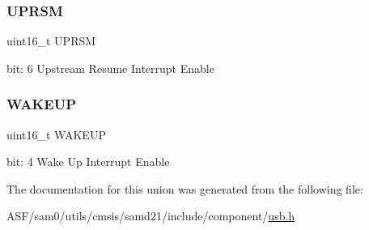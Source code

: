 \subsubsection{\texorpdfstring{UPRSM}{UPRSM}}
{\footnotesize\ttfamily uint16\+\_\+t U\+P\+R\+SM}

bit\+: 6 Upstream Resume Interrupt Enable \mbox{\label{union_u_s_b___d_e_v_i_c_e___i_n_t_e_n_s_e_t___type_a8daebdfb4a00acfdbe16023d636e3887}} 
\subsubsection{\texorpdfstring{WAKEUP}{WAKEUP}}
{\footnotesize\ttfamily uint16\+\_\+t W\+A\+K\+E\+UP}

bit\+: 4 Wake Up Interrupt Enable 

The documentation for this union was generated from the following file\+:\begin{DoxyCompactItemize}
\item 
A\+S\+F/sam0/utils/cmsis/samd21/include/component/\mbox{\hyperlink{component_2usb_8h}{usb.\+h}}\end{DoxyCompactItemize}
